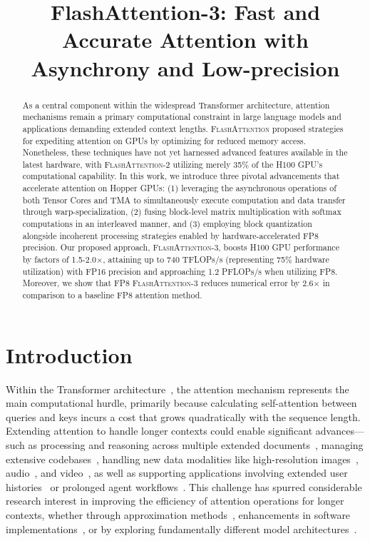 \title{FlashAttention-3: Fast and Accurate Attention with Asynchrony and Low-precision}

\begin{abstract}
As a central component within the widespread Transformer architecture, attention mechanisms remain a primary computational constraint in large language models and applications demanding extended context lengths. \textsc{FlashAttention} proposed strategies for expediting attention on GPUs by optimizing for reduced memory access. Nonetheless, these techniques have not yet harnessed advanced features available in the latest hardware, with \textsc{FlashAttention-2} utilizing merely 35\% of the H100 GPU's computational capability. In this work, we introduce three pivotal advancements that accelerate attention on Hopper GPUs: (1) leveraging the asynchronous operations of both Tensor Cores and TMA to simultaneously execute computation and data transfer through warp-specialization, (2) fusing block-level matrix multiplication with softmax computations in an interleaved manner, and (3) employing block quantization alongside incoherent processing strategies enabled by hardware-accelerated FP8 precision. Our proposed approach, \textsc{FlashAttention-3}, boosts H100 GPU performance by factors of 1.5-2.0$\times$, attaining up to 740 TFLOPs/s (representing 75\% hardware utilization) with FP16 precision and approaching 1.2 PFLOPs/s when utilizing FP8. Moreover, we show that FP8 \textsc{FlashAttention-3} reduces numerical error by 2.6$\times$ in comparison to a baseline FP8 attention method.
\end{abstract}

\section{Introduction}
\label{sec:intro}

Within the Transformer architecture~\citep{vaswani2017attention}, the attention mechanism represents the main computational hurdle, primarily because calculating self-attention between queries and keys incurs a cost that grows quadratically with the sequence length. Extending attention to handle longer contexts could enable significant advances—such as processing and reasoning across multiple extended documents~\citep{guo2021longt5,shaham2022scrolls,peng2023yarn}, managing extensive codebases~\citep{roziere2023code, li2023starcoder}, handling new data modalities like high-resolution images~\citep{chen2022scaling}, audio~\citep{gulati2020conformer}, and video~\citep{ho2022video}, as well as supporting applications involving extended user histories~\citep{sun2019bert4rec} or prolonged agent workflows~\citep{yao2022react}. This challenge has spurred considerable research interest in improving the efficiency of attention operations for longer contexts, whether through approximation methods~\citep{katharopoulos2020transformers,choromanski2020rethinking,
tay2020efficient}, enhancements in software implementations~\citep{rabe2021self,dao2022flashattention,kwon2023efficient}, or by exploring fundamentally different model architectures~\citep{peng2023rwkv,sun2023retentive,gu2023mamba}.

